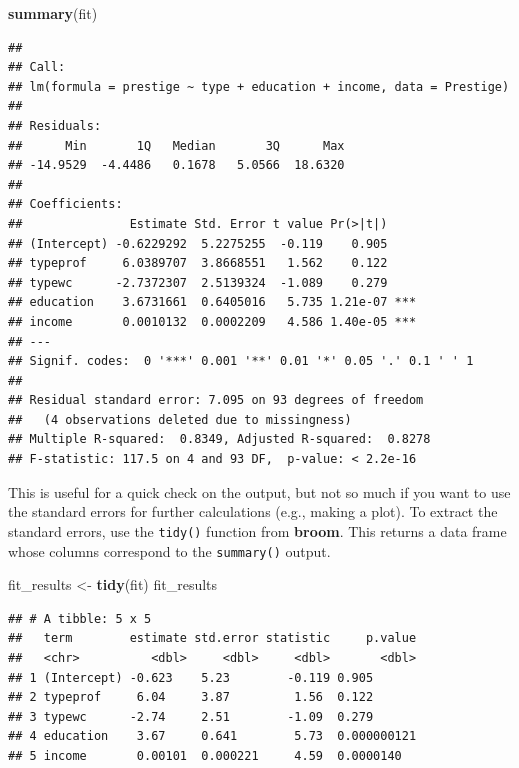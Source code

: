 \documentclass[
  12pt,
  oneside,openany]{book}
\newenvironment{Shaded}{\begin{snugshade}}{\end{snugshade}}
\newcommand{\KeywordTok}[1]{\textcolor[rgb]{0.13,0.29,0.53}{\textbf{#1}}}
\newcommand{\NormalTok}[1]{#1}
\newcommand{\StringTok}[1]{\textcolor[rgb]{0.31,0.60,0.02}{#1}}
\begin{document}
\begin{Shaded}
\begin{Highlighting}[]
\KeywordTok{summary}\NormalTok{(fit)}
\end{Highlighting}
\end{Shaded}

\begin{verbatim}
## 
## Call:
## lm(formula = prestige ~ type + education + income, data = Prestige)
## 
## Residuals:
##      Min       1Q   Median       3Q      Max 
## -14.9529  -4.4486   0.1678   5.0566  18.6320 
## 
## Coefficients:
##               Estimate Std. Error t value Pr(>|t|)    
## (Intercept) -0.6229292  5.2275255  -0.119    0.905    
## typeprof     6.0389707  3.8668551   1.562    0.122    
## typewc      -2.7372307  2.5139324  -1.089    0.279    
## education    3.6731661  0.6405016   5.735 1.21e-07 ***
## income       0.0010132  0.0002209   4.586 1.40e-05 ***
## ---
## Signif. codes:  0 '***' 0.001 '**' 0.01 '*' 0.05 '.' 0.1 ' ' 1
## 
## Residual standard error: 7.095 on 93 degrees of freedom
##   (4 observations deleted due to missingness)
## Multiple R-squared:  0.8349, Adjusted R-squared:  0.8278 
## F-statistic: 117.5 on 4 and 93 DF,  p-value: < 2.2e-16
\end{verbatim}

This is useful for a quick check on the output, but not so much if you want to use the standard errors for further calculations (e.g., making a plot). To extract the standard errors, use the \texttt{tidy()} function from \textbf{broom}. This returns a data frame whose columns correspond to the \texttt{summary()} output.

\begin{Shaded}
\begin{Highlighting}[]
\NormalTok{fit\_results \textless{}{-}}\StringTok{ }\KeywordTok{tidy}\NormalTok{(fit)}
\NormalTok{fit\_results}
\end{Highlighting}
\end{Shaded}

\begin{verbatim}
## # A tibble: 5 x 5
##   term        estimate std.error statistic     p.value
##   <chr>          <dbl>     <dbl>     <dbl>       <dbl>
## 1 (Intercept) -0.623    5.23        -0.119 0.905      
## 2 typeprof     6.04     3.87         1.56  0.122      
## 3 typewc      -2.74     2.51        -1.09  0.279      
## 4 education    3.67     0.641        5.73  0.000000121
## 5 income       0.00101  0.000221     4.59  0.0000140
\end{verbatim}
\end{document}
